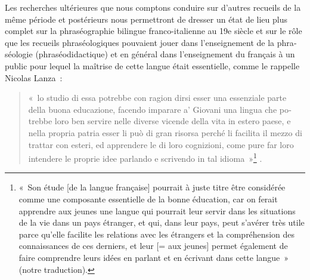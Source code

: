 \documentclass[output=paper,booklanguage=french]{langscibook}
\begin{document}
\begin{otherlanguage}{french}
Les recherches ultérieures que nous comptons conduire sur d’autres recueils de la même période et postérieurs nous permettront de dresser un état de lieu plus complet sur la phraséographie bilingue franco-italienne au 19e siècle et sur le rôle que les recueils phraséologiques pouvaient jouer dans l’enseignement de la phraséologie (phraséodidactique) et en général dans l’enseignement du français à un public pour lequel la maîtrise de cette langue était essentielle, comme le rappelle Nicolas Lanza~: 

\begin{quote}
    «~lo studio di essa potrebbe con ragion dirsi esser una essenziale parte della buona educazione, facendo imparare a’ Giovani una lingua che potrebbe loro ben servire nelle diverse vicende della vita in estero paese, e nella propria patria esser li può di gran risorsa perché li facilita il mezzo di trattar con esteri, ed apprendere le di loro cognizioni, come pure far loro intendere le proprie idee parlando e scrivendo in tal idioma~»\footnote{«~Son étude [de la langue française] pourrait à juste titre être considérée comme une composante essentielle de la bonne éducation, car on ferait apprendre aux jeunes une langue qui pourrait leur servir dans les situations de la vie dans un pays étranger, et qui, dans leur pays, peut s’avérer très utile parce qu’elle facilite les relations avec les étrangers et la compréhension des connaissances de ces derniers, et leur [= aux jeunes] permet également de faire comprendre leurs idées en parlant et en écrivant dans cette langue~» (notre traduction).} \citep[3]{Lanza1837}.
\end{quote}

{\sloppy\printbibliography[heading=subbibliography,notkeyword=this]}
\end{otherlanguage}
\end{document}
